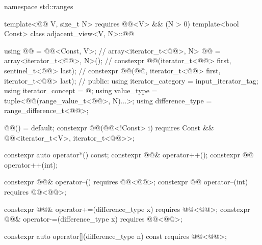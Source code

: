 \begin{codeblock}
namespace std::ranges {
  template<@@ V, size_t N>
    requires @@<V> && (N > 0)
  template<bool Const>
  class adjacent_view<V, N>::@@ {
    using @@ = @@<Const, V>;                                         // \expos
    array<iterator_t<@@>, N> @@ = array<iterator_t<@@>, N>();         // \expos
    constexpr @@(iterator_t<@@> first, sentinel_t<@@> last);          // \expos
    constexpr @@(@@, iterator_t<@@> first, iterator_t<@@> last);
                                                                                // \expos
  public:
    using iterator_category = input_iterator_tag;
    using iterator_concept  = @\seebelow@;
    using value_type = tuple<@@(range_value_t<@@>, N)...>;
    using difference_type = range_difference_t<@@>;

    @@() = default;
    constexpr @@(@@<!Const> i)
      requires Const && @@<iterator_t<V>, iterator_t<@@>>;

    constexpr auto operator*() const;
    constexpr @@& operator++();
    constexpr @@ operator++(int);

    constexpr @@& operator--() requires @@<@@>;
    constexpr @@ operator--(int) requires @@<@@>;

    constexpr @@& operator+=(difference_type x)
      requires @@<@@>;
    constexpr @@& operator-=(difference_type x)
      requires @@<@@>;

    constexpr auto operator[](difference_type n) const
      requires @@<@@>;

}}
\end{codeblock}
